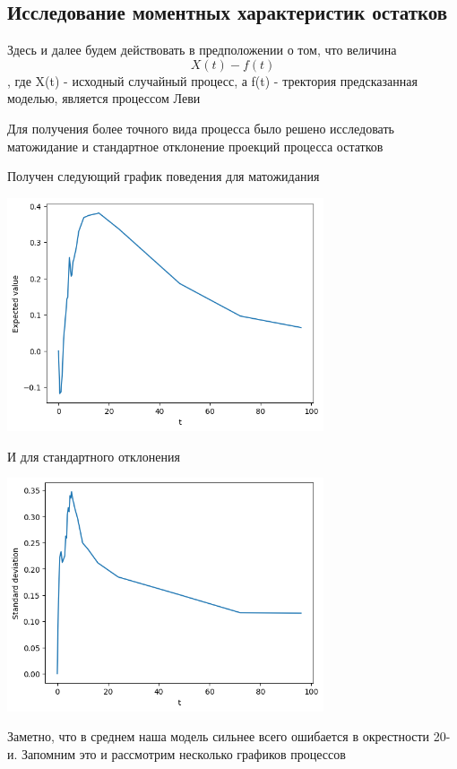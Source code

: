 \documentclass{article}
\begin{document}
\subsection{Исследование моментных характеристик остатков}

Здесь и далее будем действовать в предположении о том, что величина
\[
	X(t) - f(t)
\], где X(t) - исходный случайный процесс, а f(t) - тректория предсказанная моделью, является процессом Леви

Для получения более точного вида процесса было решено исследовать матожидание и стандартное отклонение проекций процесса остатков \newline\newline


Получен следующий график поведения для матожидания

\includegraphics[width=0.7\textwidth, left]{mean.png}

И для стандартного отклонения

\includegraphics[width=0.7\textwidth, left]{std.png}

Заметно, что в среднем наша модель сильнее всего ошибается в окрестности 20-и. Запомним это и рассмотрим несколько графиков процессов
\end{document}
